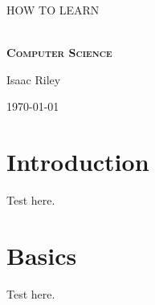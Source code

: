 \documentclass[a4, 12pt]{article}
\begin{document}
\begin{titlepage}


\thispagestyle{fancy}

\vphantom{x}

\vspace{0.5in}

\center


\textsc{\large HOW TO LEARN}

\vspace{0.5in}

\noindent\makebox[\linewidth]{\rule{\linewidth}{1.2pt}}\\
\vspace{2mm}
\textsc{ \textbf{\large Computer Science }}
\noindent\makebox[\linewidth]{\rule{\linewidth}{1.2pt}}

\vspace{2.5in}
Isaac Riley

\today

\end{titlepage}

\newpage

\setcounter{page}{2}
\tableofcontents
\newpage

\section{Introduction}
Test here.
\section{Basics}
Test here.


\end{document}
